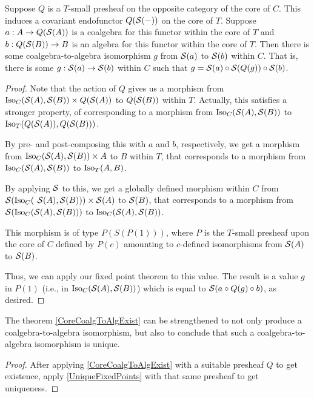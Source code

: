 \begin{theorem}\label{CoreCoalgToAlgExist}
Suppose $Q$ is a $T$-small presheaf on the opposite category of the core of $C$. This induces a covariant endofunctor $Q(\mathcal{S}(-))$ on the core of $T$. Suppose $a : A \to Q(\mathcal{S}(A))$ is a coalgebra for this functor within the core of $T$ and $b : Q(\mathcal{S}(B)) \to B$ is an algebra for this functor within the core of $T$. Then there is some coalgebra-to-algebra isomorphism $g$ from $\mathcal{S}(a)$ to $\mathcal{S}(b)$ within $C$. That is, there is some $g : \mathcal{S}(a) \to \mathcal{S}(b)$ within $C$ such that $g = \mathcal{S}(a) \circ \mathcal{S}(Q(g)) \circ \mathcal{S}(b)$.
\end{theorem}
\begin{proof}
Note that the action of $Q$ gives us a morphism from $\operatorname{Iso}_{C}(\mathcal{S}(A), \mathcal{S}(B)) \times Q(\mathcal{S}(A))$ to $Q(\mathcal{S}(B))$ within $T$. Actually, this satisfies a stronger property, of corresponding to a morphism from $\operatorname{Iso}_{C}(\mathcal{S}(A), \mathcal{S}(B))$ to $\operatorname{Iso}_T(Q(\mathcal{S}(A)), Q(\mathcal{S}(B)))$.

By pre- and post-composing this with $a$ and $b$, respectively, we get a morphism from $\operatorname{Iso}_C(\mathcal{S}(A), \mathcal{S}(B)) \times A$ to $B$ within $T$, that corresponds to a morphism from $\operatorname{Iso}_C(\mathcal{S}(A), \mathcal{S}(B))$ to $\operatorname{Iso}_T(A, B)$.

By applying $\mathcal{S}$ to this, we get a globally defined morphism within $C$ from $\mathcal{S}(\operatorname{Iso}_C($ $\mathcal{S}(A), \mathcal{S}(B))) \times \mathcal{S}(A)$ to $\mathcal{S}(B)$, that corresponds to a morphism from $\mathcal{S}(\operatorname{Iso}_C(\mathcal{S}(A), \mathcal{S}(B)))$ to $\operatorname{Iso}_C(\mathcal{S}(A), \mathcal{S}(B))$.

This morphism is of type $P(S(P(1)))$, where $P$ is the $T$-small presheaf upon the core of $C$ defined by $P(c)$ amounting to $c$-defined isomorphisms from $\mathcal{S}(A)$ to $\mathcal{S}(B)$.

Thus, we can apply our fixed point theorem  to this value. The result is a value $g$ in $P(1)$ (i.e., in $\operatorname{Iso}_C(\mathcal{S}(A), \mathcal{S}(B))$) which is equal to $\mathcal{S}(a \circ Q(g) \circ b)$, as desired.

\end{proof}

\begin{theorem}
The theorem \cref{CoreCoalgToAlgExist} can be strengthened to not only produce a coalgebra-to-algebra isomorphism, but also to conclude that such a coalgebra-to-algebra isomorphism is unique.
\end{theorem}
\begin{proof}
After applying \cref{CoreCoalgToAlgExist} with a suitable presheaf $Q$ to get existence, apply \cref{UniqueFixedPoints} with that same presheaf to get uniqueness.
\end{proof}

